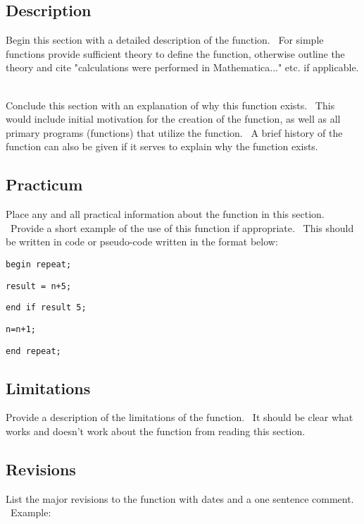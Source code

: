 \subsection*{Description}

Begin this section with a detailed description of the function. \ For simple
functions provide sufficient theory to define the function, otherwise
outline the theory and cite "calculations were performed in Mathematica..."
etc. if applicable. \ 

Conclude this section with an explanation of why this function exists. \
This would include initial motivation for the creation of the function, as
well as all primary programs (functions) that utilize the function. \ A
brief history of the function can also be given if it serves to explain why
the function exists. \ 

\subsection*{Practicum}

Place any and all practical information about the function in this section.
\ Provide a short example of the use of this function if appropriate. \ This
should be written in code or pseudo-code written in the format below:

\bigskip

\qquad\texttt{begin repeat;}

\qquad\qquad\texttt{result = n+5;}

\qquad\qquad\texttt{end if result \TEXTsymbol{>} 5;}

\qquad\qquad\texttt{n=n+1;}

\qquad\texttt{end repeat;}

\bigskip

\subsection*{Limitations}

Provide a description of the limitations of the function. \ It should be
clear what works and doesn't work about the function from reading this
section. \ 

\subsection*{Revisions}

List the major revisions to the function with dates and a one sentence
comment. \ Example:

